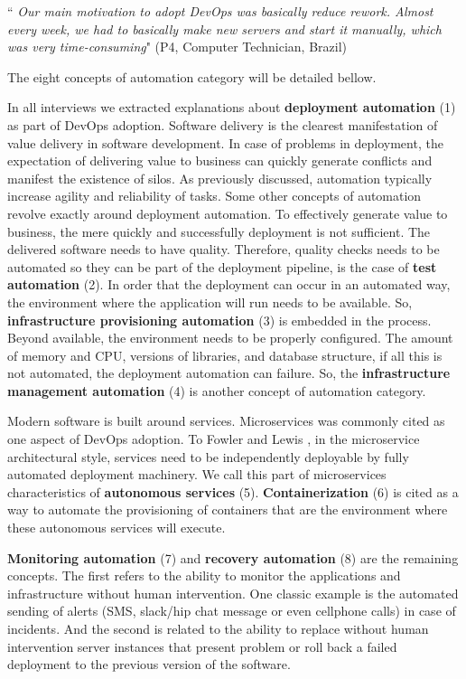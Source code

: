 \begin{mq}
``\emph{
Our main motivation to adopt DevOps was basically reduce rework. Almost every
week, we had to basically make new servers and start it manually, which was
very time-consuming}" (P4, Computer Technician, Brazil)
\end{mq}

The eight concepts of automation category will be detailed bellow.

In all interviews we extracted explanations about \textbf{deployment
automation} (1) as part of DevOps adoption. Software delivery is the clearest
manifestation of value delivery in software development. In case of problems
in deployment, the expectation of delivering value to business can quickly
generate conflicts and manifest the existence of silos. As previously discussed,
automation typically increase agility and reliability of tasks. Some other
concepts of automation revolve exactly around deployment automation. To
effectively generate value to business, the mere quickly and successfully
deployment is not sufficient. The delivered software needs to have quality.
Therefore, quality checks needs to be automated so they can be part of the
deployment pipeline, is the case of \textbf{test automation} (2). In order
that the deployment can occur in an automated way, the environment where the
application will run needs to be available. So, \textbf{infrastructure
provisioning automation} (3) is embedded in the process. Beyond available,
the environment needs to be properly configured. The amount of memory and CPU,
versions of libraries, and database structure, if all this is not automated,
the deployment automation can failure. So, the \textbf{infrastructure management
automation} (4) is another concept of automation category.

Modern software is built around services. Microservices  was commonly cited
as one aspect of DevOps adoption. To Fowler and Lewis
\cite{martinfowler2014microservices}, in the
microservice architectural style, services need to be independently deployable
by fully automated deployment machinery. We call this part of microservices
characteristics of \textbf{autonomous services} (5). \textbf{Containerization}
(6) is cited as a way to automate the provisioning of containers that are the
environment where these autonomous services will execute.

\textbf{Monitoring automation} (7) and \textbf{recovery automation} (8) are the
remaining concepts. The first refers to the ability to monitor the
applications and infrastructure without human intervention. One classic example
is the automated sending of alerts (SMS, slack/hip chat message or even
cellphone calls) in case of incidents. And the second is related to the ability
to replace without human intervention server instances that present problem or
roll back a failed deployment to the previous version of the software.


